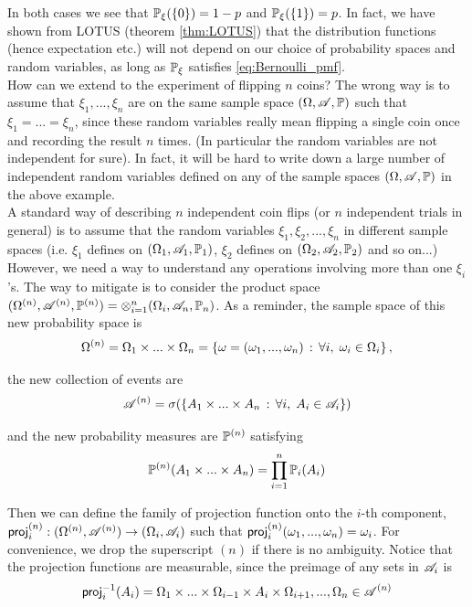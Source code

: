 In both cases we see that $\mathbb{P}_\xi(\left\{ 0 \right \}) = 1-p$ and $\mathbb{P}_\xi(\left\{ 1 \right \}) = p$. In fact, we have shown from LOTUS (theorem \ref{thm:LOTUS}) that the distribution functions (hence expectation etc.) will not depend on our choice of probability spaces and random variables, as long as $\mathbb{P}_\xi$ satisfies \eqref{eq:Bernoulli_pmf}.\\

How can we extend to the experiment of flipping $n$ coins? The wrong way is to assume that $\xi_1, ..., \xi_n$ are on the same sample space $(\Omega, \mathcal{A}, \mathbb{P})$ such that $\xi_1= ...= \xi_n$, since these random variables really mean flipping a single coin once and recording the result $n$ times. (In particular the random variables are not independent for sure). In fact, it will be hard to write down a large number of independent random variables defined on any of the sample spaces $(\Omega, \mathcal{A}, \mathbb{P})$ in the above example. \\

A standard way of describing $n$ independent coin flips (or $n$ independent trials in general) is to assume that the random variables $\xi_1, \xi_2, ..., \xi_n$ in different sample spaces (i.e. $\xi_1$ defines on $(\Omega_1, \mathcal{A}_1, \mathbb{P}_1)$, $\xi_2$ defines on $(\Omega_2, \mathcal{A}_2, \mathbb{P}_2)$ and so on...) However, we need a way to understand any operations involving more than one $\xi_i$'s. The way to mitigate is to consider the product space $(\Omega^{(n)}, \mathcal{A}^{(n)}, \mathbb{P}^{(n)}) = \otimes_{i=1}^n (\Omega_i, \mathcal{A}_n, \mathbb{P}_n)$. As a reminder, the sample space of this new probability space is 
\begin{equation*}
    \Omega^{(n)} = \Omega_1 \times ... \times \Omega_n = \left\{ \omega = (\omega_1,...,\omega_n) \,:\, \forall i, \; \omega_i \in \Omega_i \right \},
\end{equation*}

the new collection of events are
\begin{equation*}
    \mathcal{A}^{(n)} = \sigma(\left\{ A_1 \times ... \times A_n \,:\, \forall i, \; A_i \in \mathcal{A}_i \right \})
\end{equation*}

and the new probability measures are $\mathbb{P}^{(n)}$ satisfying 
\begin{equation*}
    \mathbb{P}^{(n)}(A_1 \times ... \times A_n) = \prod_{i=1}^n \mathbb{P}_i(A_i)
\end{equation*}

Then we can define the family of projection function onto the $i$-th component,  $\mathsf{proj}^{(n)}_i: (\Omega^{(n)},\mathcal{A}^{(n)}) \to (\Omega_i, \mathcal{A}_i)$ such that $\mathsf{proj}^{(n)}_i(\omega_1, ..., \omega_n) = \omega_i$. For convenience, we drop the superscript $(n)$ if there is no ambiguity. Notice that the projection functions are measurable, since the preimage of any sets in $\mathcal{A}_i$ is 
$$\mathsf{proj}_i^{-1}(A_i) = \Omega_1 \times ... \times \Omega_{i-1} \times A_i \times \Omega_{i+1}, ..., \Omega_n \in \mathcal{A}^{(n)}$$


